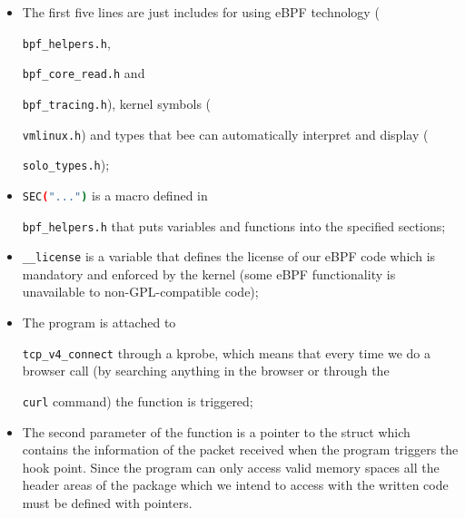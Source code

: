 \begin{itemize}
	\item 
		The first five lines are just includes for using eBPF technology (\raggedright\colorbox{backcolour}{\lstinline[style=commandline, language=bash]|bpf_helpers.h|}, \raggedright\colorbox{backcolour}{\lstinline[style=commandline, language=bash]|bpf_core_read.h|} and \raggedright\colorbox{backcolour}{\lstinline[style=commandline, language=bash]|bpf_tracing.h|}), kernel symbols (\raggedright\colorbox{backcolour}{\lstinline[style=commandline, language=bash]|vmlinux.h|}) and types that bee can automatically interpret and display (\raggedright\colorbox{backcolour}{\lstinline[style=commandline, language=bash]|solo_types.h|});
	\item 
		\raggedright\colorbox{backcolour}{\lstinline[style=commandline, language=bash]|SEC("...")|} is a macro defined in \raggedright\colorbox{backcolour}{\lstinline[style=commandline, language=bash]|bpf_helpers.h|} that puts variables and functions into the specified sections;
	\item 
		\raggedright\colorbox{backcolour}{\lstinline[style=commandline, language=bash]|__license|} is a variable that defines the license of our eBPF code which is mandatory and enforced by the kernel (some eBPF functionality is unavailable to non-GPL-compatible code);
	\item 
		The program is attached to \raggedright\colorbox{backcolour}{\lstinline[style=commandline, language=bash]|tcp_v4_connect|} through a kprobe, which means that every time we do a browser call (by searching anything in the browser or through the \raggedright\colorbox{backcolour}{\lstinline[style=commandline, language=bash]|curl|} command) the function is triggered;
	\item 
		The second parameter of the function is a pointer to the struct which contains the information of the packet received when the program triggers the hook point.
		Since the program can only access valid memory spaces all the header areas of the package which we intend to access with the written code must be defined with pointers.
\end{itemize}

